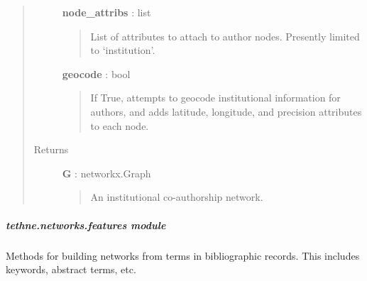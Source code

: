 \documentclass[letterpaper,10pt,english]{sphinxmanual}
\begin{document}
\begin{fulllineitems}
\begin{quote}
\begin{description}
\textbf{node\_attribs} : list
\begin{quote}

List of attributes to attach to author nodes. Presently limited to
`institution'.
\end{quote}

\textbf{geocode} : bool
\begin{quote}

If True, attempts to geocode institutional information for authors, and
adds latitude, longitude, and precision attributes to each node.
\end{quote}

\item[{Returns}] \leavevmode
\textbf{G} : networkx.Graph
\begin{quote}

An institutional co-authorship network.
\end{quote}

\end{description}\end{quote}

\end{fulllineitems}



\subparagraph{tethne.networks.features module}
\label{tethne.networks.features:tethne-networks-features-module}\label{tethne.networks.features:module-tethne.networks.features}\label{tethne.networks.features::doc}
Methods for building networks from terms in bibliographic records. This
includes keywords, abstract terms, etc.
\end{document}
